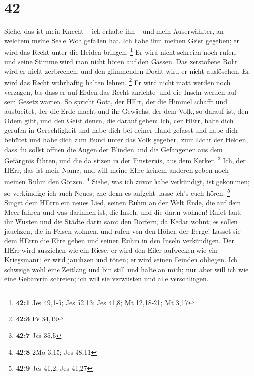 \hypertarget{section-14}{%
\section{42}\label{section-14}}

 Siehe, das ist mein Knecht -- ich erhalte ihn -- und mein
Auserwählter, an welchem meine Seele Wohlgefallen hat. Ich habe ihm
meinen Geist gegeben; er wird das Recht unter die Heiden bringen.
\footnote{\textbf{42:1} Jes 49,1-6; Jes 52,13; Jes 41,8; Mt 12,18-21; Mt
  3,17}  Er wird nicht schreien noch rufen, und seine Stimme
wird man nicht hören auf den Gassen.  Das zerstoßene Rohr
wird er nicht zerbrechen, und den glimmenden Docht wird er nicht
auslöschen. Er wird das Recht wahrhaftig halten lehren. \footnote{\textbf{42:3}
  Ps 34,19}  Er wird nicht matt werden noch verzagen, bis
dass er auf Erden das Recht anrichte; und die Inseln werden auf sein
Gesetz warten.  So spricht Gott, der HErr, der die Himmel
schafft und ausbreitet, der die Erde macht und ihr Gewächs, der dem
Volk, so darauf ist, den Odem gibt, und den Geist denen, die darauf
gehen:  Ich, der HErr, habe dich gerufen in Gerechtigkeit
und habe dich bei deiner Hand gefasst und habe dich behütet und habe
dich zum Bund unter das Volk gegeben, zum Licht der Heiden, 
dass du sollst öffnen die Augen der Blinden und die Gefangenen aus dem
Gefängnis führen, und die da sitzen in der Finsternis, aus dem Kerker.
\footnote{\textbf{42:7} Jes 35,5}  Ich, der HErr, das ist
mein Name; und will meine Ehre keinem anderen geben noch meinen Ruhm den
Götzen. \footnote{\textbf{42:8} 2Mo 3,15; Jes 48,11}  Siehe,
was ich zuvor habe verkündigt, ist gekommen; so verkündige ich auch
Neues; ehe denn es aufgeht, lasse ich's euch hören. \footnote{\textbf{42:9}
  Jes 41,2; Jes 41,27}  Singet dem HErrn ein neues Lied,
seinen Ruhm an der Welt Ende, die auf dem Meer fahren und was darinnen
ist, die Inseln und die darin wohnen!  Rufet laut, ihr
Wüsten und die Städte darin samt den Dörfern, da Kedar wohnt; es sollen
jauchzen, die in Felsen wohnen, und rufen von den Höhen der Berge!
 Lasset sie dem HErrn die Ehre geben und seinen Ruhm in den
Inseln verkündigen.  Der HErr wird ausziehen wie ein Riese;
er wird den Eifer aufwecken wie ein Kriegsmann; er wird jauchzen und
tönen; er wird seinen Feinden obliegen.  Ich schweige wohl
eine Zeitlang und bin still und halte an mich; nun aber will ich wie
eine Gebärerin schreien; ich will sie verwüsten und alle verschlingen.
